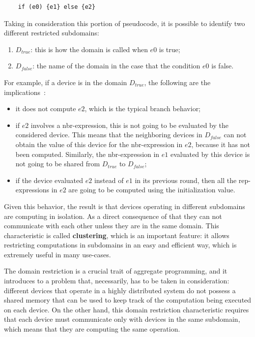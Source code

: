 \begin{lstlisting}
    if (e0) {e1} else {e2}
\end{lstlisting}
Taking in consideration this portion of pseudocode, it is possible to identify two different restricted subdomains: 
\begin{enumerate}
    \item \textbf{$D_{true}$}: this is how the domain is called when $e0$ is true;
    \item \textbf{$D_{false}$}: the name of the domain in the case that the condition $e0$ is false.
\end{enumerate}
For example, if a device is in the domain $D_{true}$, the following are the implications~\cite{computational_fields_theory}:
\begin{itemize}
    \item it does not compute $e2$, which is the typical branch behavior;
    \item if $e2$ involves a nbr-expression, this is not going to be evaluated by the considered device. This means that the neighboring devices in $D_{false}$ can not obtain the value of this device for the nbr-expression in $e2$, because it has not been computed. Similarly, the nbr-expression in $e1$ evaluated by this device is not going to be shared from $D_{true}$ to $D_{false}$;
    \item if the device evaluated $e2$ instead of $e1$ in its previous round, then all the rep-expressions in $e2$ are going to be computed using the initialization value.
\end{itemize}

Given this behavior, the result is that devices operating in different subdomains are computing in isolation. As a direct consequence of that they can not communicate with each other unless they are in the same domain. This characteristic is called \textbf{clustering}, which is an important feature: it allows restricting computations in subdomains in an easy and efficient way, which is extremely useful in many use-cases.

The domain restriction is a crucial trait of aggregate programming, and it introduces to a problem that, necessarily, has to be taken in consideration: different devices that operate in a highly distributed system do not possess a shared memory that can be used to keep track of the computation being executed on each device. On the other hand, this domain restriction characteristic requires that each device must communicate only with devices in the same subdomain, which means that they are computing the same operation.

